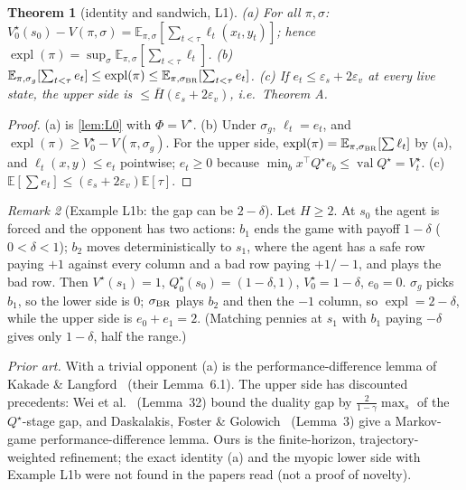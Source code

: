 \documentclass[10pt]{article}
\theoremstyle{plain}
\newtheorem{theorem}{Theorem}
\theoremstyle{definition}
\theoremstyle{remark}
\newtheorem{remark}[theorem]{Remark}
\newcommand{\E}{\mathbb{E}}
\newcommand{\Hbar}{\bar H}
\newcommand{\epss}{\varepsilon_s}
\newcommand{\epsv}{\varepsilon_v}
\DeclareMathOperator{\val}{val}
\DeclareMathOperator{\expl}{expl}
\begin{document}
\begin{theorem}[identity and sandwich, L1]\label{thm:L1}
(a) For all $\pi,\sigma$: $V^\star_0(s_0)-V(\pi,\sigma)=\E_{\pi,\sigma}[\sum_{t<\tau}\ell_t(x_t,y_t)]$; hence $\expl(\pi)=\sup_\sigma\E_{\pi,\sigma}[\sum_{t<\tau}\ell_t]$.
(b) $\E_{\pi,\sigma_g}[\sum_{t<\tau}e_t]\le\expl(\pi)\le\E_{\pi,\sigma_{\rm BR}}[\sum_{t<\tau}e_t]$.
(c) If $e_t\le\epss+2\epsv$ at every live state, the upper side is $\le\Hbar(\epss+2\epsv)$, i.e.\ Theorem A.
\end{theorem}
\begin{proof}
(a) is \cref{lem:L0} with $\Phi=V^\star$. (b) Under $\sigma_g$, $\ell_t=e_t$, and $\expl(\pi)\ge V^\star_0-V(\pi,\sigma_g)$. For the upper side, $\expl(\pi)=\E_{\pi,\sigma_{\rm BR}}[\sum\ell_t]$ by (a), and $\ell_t(x,y)\le e_t$ pointwise; $e_t\ge0$ because $\min_bx^\top Q^\star e_b\le\val Q^\star=V^\star_t$. (c) $\E[\sum e_t]\le(\epss+2\epsv)\E[\tau]$.
\end{proof}
\begin{remark}[Example L1b: the gap can be $2-\delta$]
Let $H\ge2$. At $s_0$ the agent is forced and the opponent has two actions: $b_1$ ends the game with payoff $1-\delta$ ($0<\delta<1$); $b_2$ moves deterministically to $s_1$, where the agent has a safe row paying $+1$ against every column and a bad row paying $+1/-1$, and plays the bad row. Then $V^\star(s_1)=1$, $Q^\star_0(s_0)=(1-\delta,1)$, $V^\star_0=1-\delta$, $e_0=0$. $\sigma_g$ picks $b_1$, so the lower side is $0$; $\sigma_{\rm BR}$ plays $b_2$ and then the $-1$ column, so $\expl=2-\delta$, while the upper side is $e_0+e_1=2$. (Matching pennies at $s_1$ with $b_1$ paying $-\delta$ gives only $1-\delta$, half the range.)
\end{remark}
\emph{Prior art.} With a trivial opponent (a) is the performance-difference lemma of Kakade \& Langford~\cite{KL02} (their Lemma~6.1). The upper side has discounted precedents: Wei et al.~\cite{Wei21} (Lemma~32) bound the duality gap by $\frac2{1-\gamma}\max_s$ of the $Q^\star$-stage gap, and Daskalakis, Foster \& Golowich~\cite{DFG20} (Lemma~3) give a Markov-game performance-difference lemma. Ours is the finite-horizon, trajectory-weighted refinement; the exact identity (a) and the myopic lower side with Example L1b were not found in the papers read (not a proof of novelty).
\end{document}
